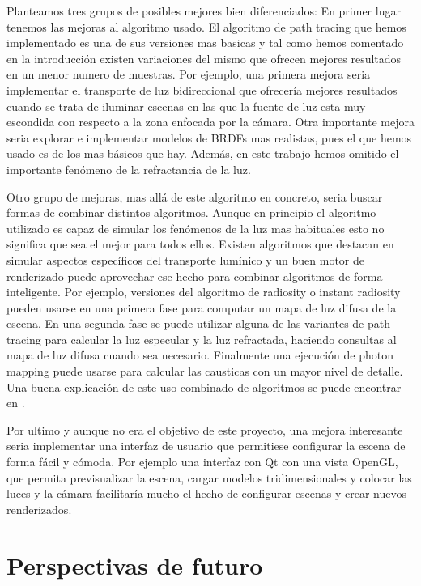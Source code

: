 Planteamos tres grupos de posibles mejores bien diferenciados: En primer lugar tenemos las mejoras al algoritmo usado. El algoritmo de path tracing que hemos implementado es una de sus versiones mas basicas y tal como hemos comentado en la introducción existen variaciones del mismo que ofrecen mejores resultados en un menor numero de muestras. Por ejemplo, una primera mejora seria implementar el transporte de luz bidireccional que ofrecería mejores resultados cuando se trata de iluminar escenas en las que la fuente de luz esta muy escondida con respecto a la zona enfocada por la cámara. Otra importante mejora seria explorar e implementar modelos de BRDFs mas realistas, pues el que hemos usado es de los mas básicos que hay. Además, en este trabajo hemos omitido el importante fenómeno de la refractancia de la luz.

\medskip

Otro grupo de mejoras, mas allá de este algoritmo en concreto, seria buscar formas de combinar distintos algoritmos. Aunque en principio el algoritmo utilizado es capaz de simular los fenómenos de la luz mas habituales esto no significa que sea el mejor para todos ellos. Existen algoritmos que destacan en simular aspectos específicos del transporte lumínico y un buen motor de renderizado puede aprovechar ese hecho para combinar algoritmos de forma inteligente. Por ejemplo, versiones del algoritmo de radiosity o instant radiosity pueden usarse en una primera fase para computar un mapa de luz difusa de la escena. En una segunda fase se puede utilizar alguna de las variantes de path tracing para calcular la luz especular y la luz refractada, haciendo consultas al mapa de luz difusa cuando sea necesario. Finalmente una ejecución de photon mapping puede usarse para calcular las causticas con un mayor nivel de detalle.
Una buena explicación de este uso combinado de algoritmos se puede encontrar en \cite{Hery2013}.

\medskip

Por ultimo y aunque no era el objetivo de este proyecto, una mejora interesante seria implementar una interfaz de usuario que permitiese configurar la escena de forma fácil y cómoda. Por ejemplo una interfaz con Qt con una vista OpenGL, que permita previsualizar la escena, cargar modelos tridimensionales y colocar las luces y la cámara facilitaría mucho el hecho de configurar escenas y crear nuevos renderizados.

\clearpage

\section{Perspectivas de futuro}

